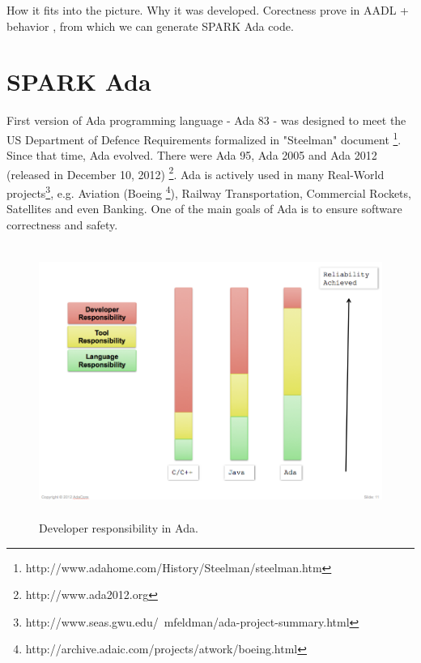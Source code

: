 How it fits into the picture. Why it was developed. Corectness prove in AADL + behavior \cite{Bless:Paper}, from which we can generate SPARK Ada code.



\section{SPARK Ada}
\label{background:spark}


First version of Ada programming language - Ada 83 - was designed to meet the US Department of Defence Requirements formalized in "Steelman" document \footnote{http://www.adahome.com/History/Steelman/steelman.htm}. Since that time, Ada evolved. There were Ada 95, Ada 2005 and Ada 2012 (released in December 10, 2012) \footnote{http://www.ada2012.org}. Ada is actively used in many Real-World projects\footnote{http://www.seas.gwu.edu/~mfeldman/ada-project-summary.html}, e.g. Aviation (Boeing \footnote{http://archive.adaic.com/projects/atwork/boeing.html}), Railway Transportation, Commercial Rockets, Satellites and even Banking. One of the main goals of Ada is to ensure software correctness and safety.

\begin{figure}[ht]%
    \begin{center}
    	\includegraphics[height=3.5in]{figures/developer_responsibility_in_ada.png}
    	\caption{Developer responsibility in Ada\protect\footnotemark. }    	
    \end{center}
\end{figure}

